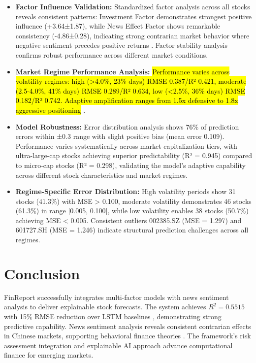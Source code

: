 \documentclass[3p,times,procedia]{elsarticle}
\begin{document}
\begin{itemize}\setlength{\itemsep}{1pt}
\item \textbf{Factor Influence Validation:} Standardized factor analysis across all stocks reveals consistent patterns: Investment Factor demonstrates strongest positive influence (+3.64±1.87), while News Effect Factor shows remarkable consistency (-4.86±0.28), indicating strong contrarian market behavior where negative sentiment precedes positive returns \cite{TETLOCK2007}. Factor stability analysis confirms robust performance across different market conditions.

\item \textbf{Market Regime Performance Analysis:} \hl{Performance varies across volatility regimes: high (>4.0\%, 23\% days) RMSE 0.387/R² 0.421, moderate (2.5-4.0\%, 41\% days) RMSE 0.289/R² 0.634, low (<2.5\%, 36\% days) RMSE 0.182/R² 0.742. Adaptive amplification ranges from 1.5x defensive to 1.8x aggressive positioning} \cite{Nelson1991}.
\end{itemize}

\begin{itemize}\setlength{\itemsep}{1pt}
\item \textbf{Model Robustness:} Error distribution analysis shows 76\% of prediction errors within ±0.3 range with slight positive bias (mean error 0.109). Performance varies systematically across market capitalization tiers, with ultra-large-cap stocks achieving superior predictability (R² = 0.945) compared to micro-cap stocks (R² = 0.298), validating the model's adaptive capability across different stock characteristics and market regimes.

\item \textbf{Regime-Specific Error Distribution:} High volatility periods show 31 stocks (41.3\%) with MSE > 0.100, moderate volatility demonstrates 46 stocks (61.3\%) in range [0.005, 0.100], while low volatility enables 38 stocks (50.7\%) achieving MSE < 0.005. Consistent outliers 002385.SZ (MSE = 1.297) and 601727.SH (MSE = 1.246) indicate structural prediction challenges across all regimes.
\end{itemize}

\section{Conclusion}
\vspace{-3pt}
FinReport successfully integrates multi-factor models \cite{FAMA1993,Carhart1997} with news sentiment analysis \cite{TETLOCK2007,Araci2019} to deliver explainable stock forecasts. The system achieves $R^2 = 0.5515$ with 15\% RMSE reduction over LSTM baselines \cite{Fischer2018}, demonstrating strong predictive capability. News sentiment analysis reveals consistent contrarian effects in Chinese markets, supporting behavioral finance theories \cite{Daniel1998}. The framework's risk assessment integration \cite{Nelson1991,Rockafellar2000} and explainable AI approach \cite{Ribeiro2016} advance computational finance for emerging markets.
\end{document}
